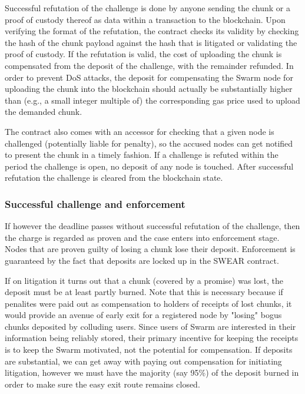 Successful refutation of the challenge is done by anyone sending the chunk or a proof of custody thereof as data within a transaction to the blockchain. Upon verifying the format of the refutation, the contract checks its validity by checking the hash of the chunk payload against the hash that is litigated or validating the proof of custody. If the refutation is valid, the cost of uploading the chunk is compensated from the deposit of the challenge, with the remainder refunded. In order to prevent DoS attacks, the deposit for compensating the Swarm node for uploading the chunk into the blockchain should actually be substantially higher than (e.g., a small integer multiple of) the corresponding gas price used to upload the demanded chunk.

The contract also comes with an accessor for checking that a given node is challenged (potentially liable for penalty), so the accused nodes can get notified to present the chunk in a timely fashion. If a challenge is refuted within the period the challenge is open, no deposit of any node is touched. After successful refutation the challenge is cleared from the blockchain state.

\subsubsection{Successful challenge and enforcement}

If however the deadline passes without successful refutation of the challenge, then the charge is regarded as proven and the case enters into enforcement stage. Nodes that are proven guilty of losing a chunk lose their deposit. Enforcement is guaranteed by the fact that deposits are locked up in the SWEAR contract.

If on litigation it turns out that a chunk (covered by a promise) was lost, the deposit must be at least partly burned. Note that this is necessary because if penalites were paid out as compensation to holders of receipts of lost chunks, it would provide an avenue of early exit for a registered node by "losing" bogus chunks deposited by colluding users. Since users of Swarm are interested in their information being reliably stored, their primary incentive for keeping the receipts is to keep the Swarm motivated, not the potential for compensation. If deposits are substantial, we can get away with paying out compensation for initiating litigation, however we must have the majority (say 95\%) of the deposit burned in order to make sure the easy exit route remains closed.

